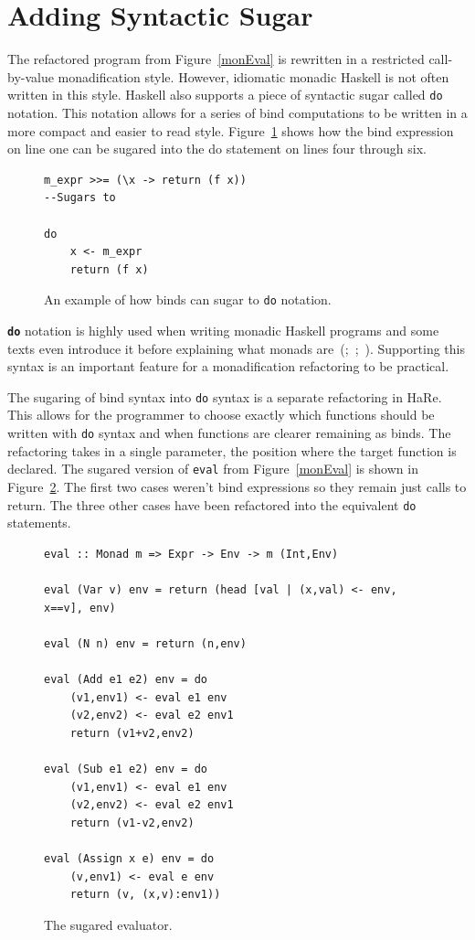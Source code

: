 \section{Adding Syntactic Sugar}

The refactored program from Figure~\ref{monEval} is rewritten in a restricted call-by-value monadification style. However, idiomatic monadic Haskell is not often written in this style. Haskell also supports a piece of syntactic sugar called \texttt{do} notation. This notation allows for a series of bind computations to be written in a more compact and easier to read style. Figure~\ref{doEx} shows how the bind expression on line one can be sugared into the do statement on lines four through six.

\begin{figure}[t]
\begin{lstlisting}
m_expr >>= (\x -> return (f x))
--Sugars to

do
	x <- m_expr
	return (f x)
\end{lstlisting}
\caption{An example of how binds can sugar to \texttt{do} notation.}
\label{doEx}
\end{figure}

\textbf{\texttt{do}} notation is highly used when writing monadic Haskell programs and some texts even introduce it before explaining what monads are~(\cite{realWorldHaskell};~\cite{haskellCraft};~\cite{learnYou}). Supporting this syntax is an important feature for a monadification refactoring to be practical. 

The sugaring of bind syntax into \texttt{do} syntax is a separate refactoring in HaRe. This allows for the programmer to choose exactly which functions should be written with \texttt{do} syntax and when functions are clearer remaining as binds. The refactoring takes in a single parameter, the position where the target function is declared. The sugared version of \texttt{eval} from Figure~\ref{monEval} is shown in Figure~\ref{finEval}. The first two cases weren't bind expressions so they remain just calls to return. The three other cases have been refactored into the equivalent \texttt{do} statements.

\begin{figure}[t]
\begin{lstlisting}
eval :: Monad m => Expr -> Env -> m (Int,Env)

eval (Var v) env = return (head [val | (x,val) <- env, x==v], env)

eval (N n) env = return (n,env)

eval (Add e1 e2) env = do
	(v1,env1) <- eval e1 env
	(v2,env2) <- eval e2 env1
	return (v1+v2,env2)

eval (Sub e1 e2) env = do
	(v1,env1) <- eval e1 env 
	(v2,env2) <- eval e2 env1
	return (v1-v2,env2)

eval (Assign x e) env = do
	(v,env1) <- eval e env
	return (v, (x,v):env1))
\end{lstlisting}
\caption{The sugared evaluator.}
\label{finEval}
\end{figure}

